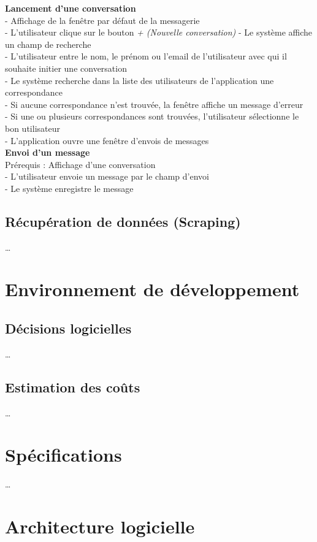 \documentclass[conference]{IEEEtran}
\begin{document}
\textbf{Lancement d'une conversation}\\
- Affichage de la fenêtre par défaut de la messagerie\\
- L'utilisateur clique sur le bouton \textit{+ (Nouvelle conversation)}
- Le système affiche un champ de recherche\\
- L'utilisateur entre le nom, le prénom ou l'email de l'utilisateur avec qui il souhaite initier une conversation\\
- Le système recherche dans la liste des utilisateurs de l'application une correspondance\\
- Si aucune correspondance n'est trouvée, la fenêtre affiche un message d'erreur\\
- Si une ou plusieurs correspondances sont trouvées, l'utilisateur sélectionne le bon utilisateur\\
- L'application ouvre une fenêtre d'envois de messages\\

\textbf{Envoi d'un message}\\
Prérequis : Affichage d'une conversation\\
- L'utilisateur envoie un message par le champ d'envoi\\
- Le système enregistre le message\\

\subsection{Récupération de données (Scraping)}
…

\section{Environnement de développement}

\subsection{Décisions logicielles}
…

\subsection{Estimation des coûts}
…

\section{Spécifications}
…

\section{Architecture logicielle}
\end{document}
